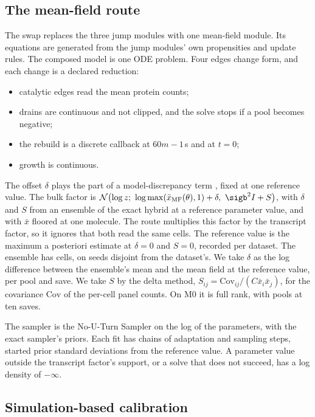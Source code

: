 \subsection{The mean-field route}
\label{sec:meanfield}

The swap replaces the three jump modules with one mean-field module. Its equations
are generated from the jump modules' own propensities and update rules. The composed
model is one ODE problem. Four edges change form, and each change is a declared
reduction:
\begin{itemize}
  \item catalytic edges read the mean protein counts;
  \item drains are continuous and not clipped, and the solve stops if a pool becomes
  negative;
  \item the rebuild is a discrete callback at $60m - 1$\,s and at $t = 0$;
  \item growth is continuous.
\end{itemize}
The offset $\delta$ plays the part of a model-discrepancy term \cite{kennedy2001bayesian}, fixed at one reference value. The bulk factor is $\mathcal{N}\!\left(\log z;\ \log \max(\bar{x}_{\mathrm{MF}}(\theta), 1)
+ \delta,\ \sigb^2 I + S\right)$, with $\delta$ and $S$ from an ensemble of the exact
hybrid at a reference parameter value, and with $\bar{x}$ floored at one molecule. The route multiplies this factor by the transcript factor, so it ignores that both read the same cells. The reference
value is the maximum a posteriori estimate at $\delta = 0$ and $S = 0$, recorded per
dataset. The ensemble has  cells, on seeds disjoint from the dataset's. We
take $\delta$ as the log difference between the ensemble's mean and the mean field at
the reference value, per pool and save. We take $S$ by the delta method, $S_{ij} = \mathrm{Cov}_{ij} / (C \bar{x}_i \bar{x}_j)$, for the covariance $\mathrm{Cov}$ of the per-cell panel counts. On M0 it is full rank, with  pools at ten saves.

The sampler is the No-U-Turn Sampler on the log of the  parameters, with
the exact sampler's priors. Each fit has  chains of 
adaptation and  sampling steps, started  prior standard
deviations from the reference value. A parameter value outside the transcript factor's
support, or a solve that does not succeed, has a log density of $-\infty$.

\subsection{Simulation-based calibration}
\label{sec:sbc}


